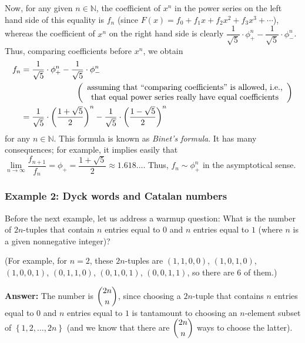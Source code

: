 Now, for any given $n\in\mathbb{N}$, the coefficient of $x^{n}$ in the power
series on the left hand side of this equality is $f_{n}$ (since $F\left(
x\right)  =f_{0}+f_{1}x+f_{2}x^{2}+f_{3}x^{3}+\cdots$), whereas the
coefficient of $x^{n}$ on the right hand side is clearly $\dfrac{1}{\sqrt{5}%
}\cdot\phi_{+}^{n}-\dfrac{1}{\sqrt{5}}\cdot\phi_{-}^{n}$. Thus, comparing
coefficients before $x^{n}$, we obtain%
\begin{align*}
f_{n}  &  =\dfrac{1}{\sqrt{5}}\cdot\phi_{+}^{n}-\dfrac{1}{\sqrt{5}}\cdot
\phi_{-}^{n}\\
&  \ \ \ \ \ \ \ \ \ \ \ \ \ \ \ \ \ \ \ \ \left(
\begin{array}
[c]{c}%
\text{assuming that \textquotedblleft comparing coefficients\textquotedblright%
\ is allowed, i.e.,}\\
\text{that equal power series really have equal coefficients}%
\end{array}
\right) \\
&  =\dfrac{1}{\sqrt{5}}\cdot\left(  \dfrac{1+\sqrt{5}}{2}\right)  ^{n}%
-\dfrac{1}{\sqrt{5}}\cdot\left(  \dfrac{1-\sqrt{5}}{2}\right)  ^{n}%
\end{align*}
for any $n\in\mathbb{N}$. This formula is known as \emph{Binet's formula}. It
has many consequences; for example, it implies easily that $\lim
\limits_{n\rightarrow\infty}\dfrac{f_{n+1}}{f_{n}}=\phi_{+}=\dfrac{1+\sqrt{5}%
}{2}\approx1.618\ldots$. Thus, $f_{n}\sim\phi_{+}^{n}$ in the asymptotical sense.

\subsubsection{Example 2: Dyck words and Catalan numbers}

Before the next example, let us address a warmup question: What is the number
of $2n$-tuples that contain $n$ entries equal to $0$ and $n$ entries equal to
$1$ (where $n$ is a given nonnegative integer)?

(For example, for $n=2$, these $2n$-tuples are $\left(  1,1,0,0\right)  $,
$\left(  1,0,1,0\right)  $, $\left(  1,0,0,1\right)  $, $\left(
0,1,1,0\right)  $, $\left(  0,1,0,1\right)  $, $\left(  0,0,1,1\right)  $, so
there are $6$ of them.)

\textbf{Answer:} The number is $\dbinom{2n}{n}$, since choosing a $2n$-tuple
that contains $n$ entries equal to $0$ and $n$ entries equal to $1$ is
tantamount to choosing an $n$-element subset of $\left\{  1,2,\ldots
,2n\right\}  $ (and we know that there are $\dbinom{2n}{n}$ ways to choose the latter).

